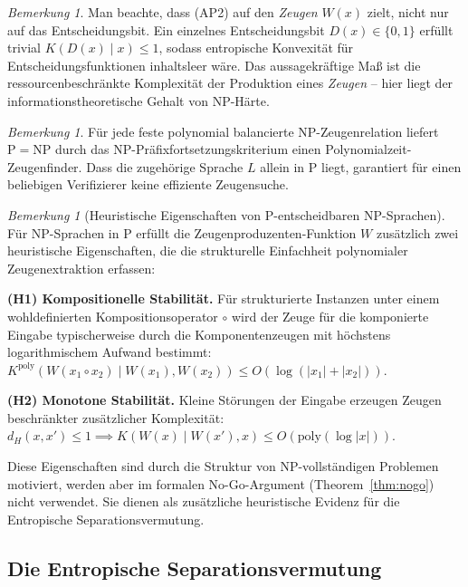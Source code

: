 \documentclass[aps,prd,twocolumn,superscriptaddress,nofootinbib]{revtex4-2}
\theoremstyle{definition}
\theoremstyle{remark}
\newtheorem{remark}[theorem]{Bemerkung}
\DeclareMathOperator{\poly}{poly}
\newcommand{\NP}{\mathrm{NP}}
\newcommand{\PP}{\mathrm{P}}
\begin{document}
\begin{remark}
Man beachte, dass (AP2) auf den \textit{Zeugen} $W(x)$ zielt, nicht nur auf das Entscheidungsbit. Ein einzelnes Entscheidungsbit $D(x) \in \{0,1\}$ erfüllt trivial $K(D(x) \mid x) \leq 1$, sodass entropische Konvexität für Entscheidungsfunktionen inhaltsleer wäre. Das aussagekräftige Maß ist die ressourcenbeschränkte Komplexität der Produktion eines \textit{Zeugen} -- hier liegt der informationstheoretische Gehalt von NP-Härte.
\end{remark}

\begin{remark}
Für jede feste polynomial balancierte NP-Zeugenrelation liefert $\PP=\NP$ durch das NP-Präfixfortsetzungskriterium einen Polynomialzeit-Zeugenfinder. Dass die zugehörige Sprache $L$ allein in $\PP$ liegt, garantiert für einen beliebigen Verifizierer keine effiziente Zeugensuche.
\end{remark}

\begin{remark}[Heuristische Eigenschaften von P-entscheidbaren NP-Sprachen]
\label{rem:heuristic-ap}
Für NP-Sprachen in $\PP$ erfüllt die Zeugenproduzenten-Funktion $W$ zusätzlich zwei heuristische Eigenschaften, die die \glqq strukturelle Einfachheit\grqq{} polynomialer Zeugenextraktion erfassen:

\textbf{(H1) Kompositionelle Stabilität.} Für strukturierte Instanzen unter einem wohldefinierten Kompositionsoperator $\circ$ wird der Zeuge für die komponierte Eingabe typischerweise durch die Komponentenzeugen mit höchstens logarithmischem Aufwand bestimmt: $K^{\poly}(W(x_1 \circ x_2) \mid W(x_1), W(x_2)) \leq O(\log(|x_1|+|x_2|))$.

\textbf{(H2) Monotone Stabilität.} Kleine Störungen der Eingabe erzeugen Zeugen beschränkter zusätzlicher Komplexität: $d_H(x,x') \leq 1 \implies K(W(x) \mid W(x'), x) \leq O(\mathrm{poly}(\log|x|))$.

Diese Eigenschaften sind durch die Struktur von $\NP$-vollständigen Problemen motiviert, werden aber im formalen No-Go-Argument (Theorem~\ref{thm:nogo}) nicht verwendet. Sie dienen als zusätzliche heuristische Evidenz für die Entropische Separationsvermutung.
\end{remark}

\subsection{Die Entropische Separationsvermutung}
\end{document}
